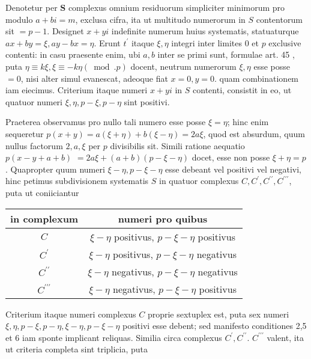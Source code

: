 \documentclass[10pt]{article}
\begin{document}
Denotetur per \(\boldsymbol{S}\) complexus omnium residuorum simpliciter minimorum pro modulo \(a+b i=m\), exclusa cifra, ita ut multitudo numerorum in \(S\) contentorum sit \(=p-1\). Designet \(x+y i\) indefinite numerum huius systematis, statuaturque \(a x+b y=\xi, a y-b x=\eta\). Erunt \(t^{\prime}\) itaque \(\xi, \eta\) integri inter limites 0 et \(p\) exclusive contenti: in casu praesente enim, ubi \(a, b\) inter se primi sunt, formulae art. 45 , puta \(\eta \equiv k \xi, \xi \equiv-k \eta(\bmod . p)\) docent, neutrum numerorum \(\xi, \eta\) esse posse \(=0\), nisi alter simul evanescat, adeoque fiat \(x=0, y=0\). quam combinationem iam eiecimus. Criterium itaque numeri \(x+y i\) in \(S\) contenti, consistit in eo, ut quatuor numeri \(\xi, \eta, p-\xi, p-\eta\) sint positivi.

Praeterea observamus pro nullo tali numero esse posse \(\xi=\eta\); hinc enim sequeretur \(p(x+y)=a(\xi+\eta)+b(\xi-\eta)=2 a \xi\), quod est absurdum, quum nullus factorum \(2, a, \xi\) per \(p\) divisibilis sit. Simili ratione aequatio \(p(x-y+a+b)\) \(=2 a \xi+(a+b)(p-\xi-\eta)\) docet, esse non posse \(\xi+\eta=p\). Quapropter quum numeri \(\xi-\eta, p-\xi-\eta\) esse debeant vel positivi vel negativi, hinc petimus subdivisionem systematis \(S\) in quatuor complexus \(C, C^{\prime}, C^{\prime \prime}, C^{\prime \prime \prime}\), puta ut coniiciantur

\begin{center}
\begin{tabular}{c|c}
in complexum & numeri pro quibus \\
\hline
\(C\) & \(\xi-\eta\) positivus, \(p-\xi-\eta\) positivus \\
\(C^{\prime}\) & \(\xi-\eta\) positivus, \(p-\xi-\eta\) negativus \\
\(C^{\prime \prime}\) & \(\xi-\eta\) negativus, \(p-\xi-\eta\) negativus \\
\(C^{\prime \prime \prime}\) & \(\xi-\eta\) negativus, \(p-\xi-\eta\) positivus \\
\end{tabular}
\end{center}

Criterium itaque numeri complexus \(C\) proprie sextuplex est, puta sex numeri \(\xi, \eta, p-\xi, p-\eta, \xi-\eta, p-\xi-\eta\) positivi esse debent; sed manifesto conditiones 2,5 et 6 iam sponte implicant reliquas. Similia circa complexus \(C^{\prime}, C^{\prime \prime}\). \(C^{\prime \prime \prime}\) valent, ita ut criteria completa sint triplicia, puta
\end{document}
